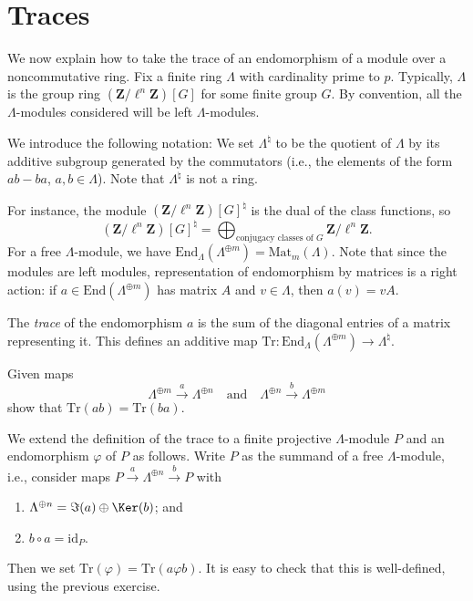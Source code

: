 \section{Traces}
\label{section-traces}

\noindent
We now explain how to take the trace of an endomorphism of a module over a
noncommutative ring. Fix a finite ring $\Lambda$ with cardinality prime to $p$.
Typically, $\Lambda$ is the group ring $(\mathbf{Z}/\ell^n\mathbf{Z})[G]$ for
some finite group $G$. By convention, all the $\Lambda$-modules considered will
be left $\Lambda$-modules.

\medskip\noindent
We introduce the following notation:
We set $\Lambda^\natural$ to be the quotient of $\Lambda$ by its additive
subgroup generated by the commutators (i.e., the elements of the form
$ab-ba$, $a, b \in \Lambda$). Note that $\Lambda^\natural$ is not a ring.

\medskip\noindent
For instance, the module $(\mathbf{Z}/\ell^n\mathbf{Z})[G]^\natural$ is the
dual of the class functions, so
$$
(\mathbf{Z}/\ell^n\mathbf{Z})[G]^\natural
=
\bigoplus\nolimits_{\text{conjugacy classes of }G}
\mathbf{Z}/\ell^n\mathbf{Z}.
$$
For a free $\Lambda$-module, we have $\text{End}_\Lambda(\Lambda^{\oplus m}) =
\text{Mat}_m(\Lambda)$. Note that since the modules are left modules,
representation of endomorphism by matrices is a right action: if $a \in
\text{End}(\Lambda^{\oplus m})$ has matrix $A$ and $v \in \Lambda$, then $a(v)
= v A$.

\begin{definition}
\label{definition-trace}
The {\it trace} of the endomorphism $a$ is the sum of the diagonal entries of
a matrix representing it. This defines an additive map $\text{Tr} :
\text{End}_\Lambda(\Lambda^{\oplus m}) \to \Lambda^\natural$.
\end{definition}

\begin{exercise}
\label{exercise-trace-is-trace}
Given maps
$$
\Lambda^{\oplus m} \xrightarrow{a} \Lambda^{\oplus n}
\quad\text{and}\quad
\Lambda^{\oplus n} \xrightarrow{b} \Lambda^{\oplus m}
$$
show that $\text{Tr}(ab) = \text{Tr}(ba)$.
\end{exercise}

\noindent
We extend the definition of the trace to a finite projective $\Lambda$-module
$P$ and an endomorphism $\varphi$ of $P$ as follows. Write $P$ as the summand
of a free $\Lambda$-module, i.e., consider maps $P \xrightarrow{a}
\Lambda^{\oplus n} \xrightarrow{b} P$ with
\begin{enumerate}
\item
$\Lambda^{\oplus n} = \Im(a) \oplus \Ker(b)$; and
\item
$b\circ a = \text{id}_P$.
\end{enumerate}
Then we set $\text{Tr}(\varphi) = \text{Tr}(a\varphi b)$. It is easy to check
that this is well-defined, using the previous exercise.








